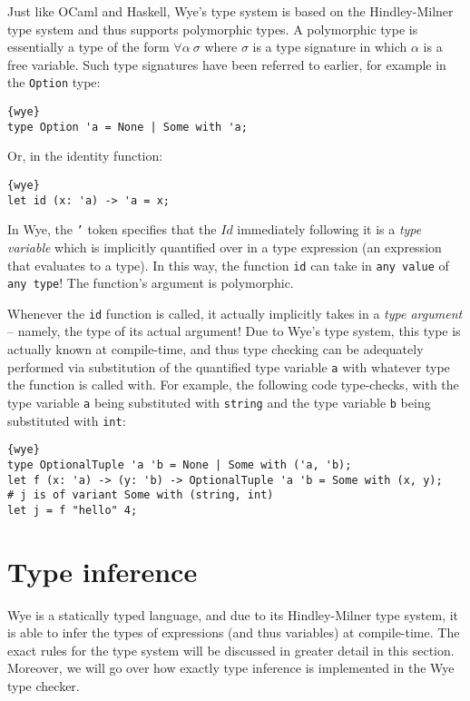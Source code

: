 \documentclass[a4paper, 12pt]{article}
\begin{document}
Just like OCaml and Haskell, Wye's type system is based on the Hindley-Milner type system and thus supports polymorphic types. A polymorphic type is essentially a type of the form $\forall \alpha\:\sigma$ where $\sigma$ is a type signature in which $\alpha$ is a free variable. Such type signatures have been referred to earlier, for example in the \texttt{Option} type:
\begin{lstlisting}{wye}
type Option 'a = None | Some with 'a;
\end{lstlisting}
Or, in the identity function:
\begin{lstlisting}{wye}
let id (x: 'a) -> 'a = x;
\end{lstlisting}
In Wye, the \texttt{'} token specifies that the $Id$ immediately following it is a \textit{type variable} which is implicitly quantified over in a type expression (an expression that evaluates to a type). In this way, the function \texttt{id} can take in \texttt{any value} of \texttt{any type}! The function's argument is polymorphic.

Whenever the \texttt{id} function is called, it actually implicitly takes in a \textit{type argument} -- namely, the type of its actual argument! Due to Wye's type system, this type is actually known at compile-time, and thus type checking can be adequately performed via substitution of the quantified type variable \texttt{a} with whatever type the function is called with. For example, the following code type-checks, with the type variable \texttt{a} being substituted with \texttt{string} and the type variable \texttt{b} being substituted with \texttt{int}:
\begin{lstlisting}{wye}
type OptionalTuple 'a 'b = None | Some with ('a, 'b);
let f (x: 'a) -> (y: 'b) -> OptionalTuple 'a 'b = Some with (x, y);
# j is of variant Some with (string, int)
let j = f "hello" 4;
\end{lstlisting}

\newpage
\section{Type inference}

Wye is a statically typed language, and due to its Hindley-Milner type system, it is able to infer the types of expressions (and thus variables) at compile-time. The exact rules for the type system will be discussed in greater detail in this section. Moreover, we will go over how exactly type inference is implemented in the Wye type checker.
\end{document}
